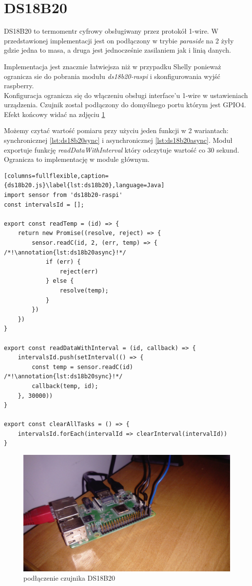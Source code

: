 \section{DS18B20}
DS18B20 to termomentr cyfrowy obsługiwany przez protokół 1-wire. W przedstawionej implementacji jest on podłączony w trybie \textit{paraside} na 2 żyły gdzie jedna to masa, a druga jest jednocześnie zasilaniem jak i linią danych. 
\par Implementacja jest znacznie łatwiejsza niż w przypadku Shelly ponieważ ogranicza sie do pobrania modułu \textit{ds18b20-raspi} i skonfigurowania wyjść raspberry. \\
Konfiguracja ogranicza się do włączeniu obsługi interface'u 1-wire w ustawieniach urządzenia. Czujnik został podłączony do domyślnego portu którym jest GPIO4. Efekt końcowy widać na zdjęciu \ref{fig:finalGPIOConnections}
\par Możemy czytać wartość pomiaru przy użyciu jeden funkcji w 2 wariantach: synchronicznej \ref{lst:ds18b20sync} i asynchronicznej \ref{lst:ds18b20async}. Moduł exportuje funkcję \textit{readDataWithInterval} który odczytuje wartość co 30 sekund. Ogranicza to implementację w module głównym.
\newpage
\begin{lstlisting}[columns=fullflexible,caption={ds18b20.js}\label{lst:ds18b20},language=Java]
import sensor from 'ds18b20-raspi'
const intervalsId = [];

export const readTemp = (id) => {
    return new Promise((resolve, reject) => {
        sensor.readC(id, 2, (err, temp) => { /*!\annotation{lst:ds18b20async}!*/
            if (err) {
                reject(err)
            } else {
                resolve(temp);
            }
        })
    })
}

export const readDataWithInterval = (id, callback) => {
    intervalsId.push(setInterval(() => {
        const temp = sensor.readC(id) /*!\annotation{lst:ds18b20sync}!*/
        callback(temp, id);
    }, 30000))
}

export const clearAllTasks = () => {
    intervalsId.forEach(intervalId => clearInterval(intervalId))
}
\end{lstlisting}
\begin{figure}[h]
  \includegraphics[width=\linewidth]{gpio.jpg}
  \caption{podłączenie czujnika DS18B20}
  \label{fig:finalGPIOConnections}
\end{figure}